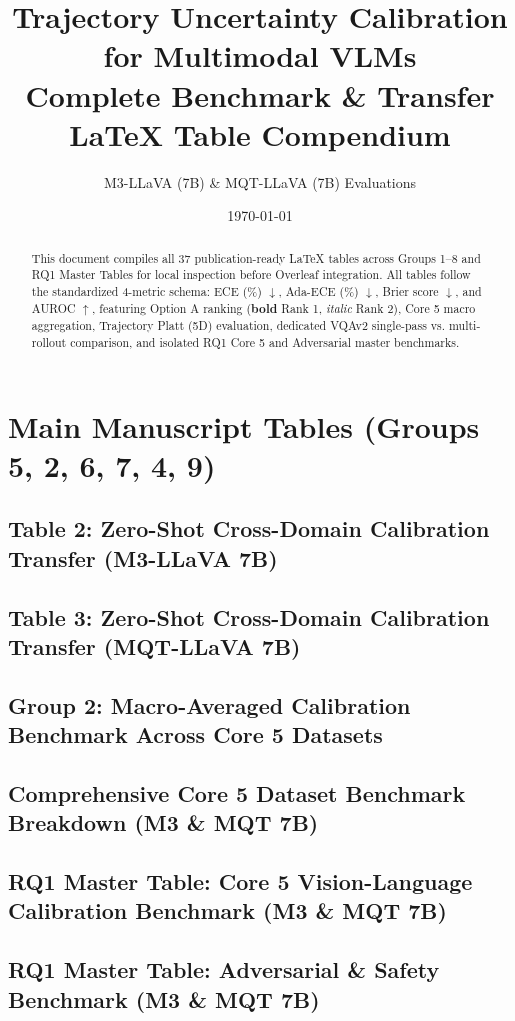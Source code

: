 \documentclass[11pt,a4paper]{article}
\title{\textbf{Trajectory Uncertainty Calibration for Multimodal VLMs}\\[0.4em] \Large Complete Benchmark \& Transfer LaTeX Table Compendium}
\author{M3-LLaVA (7B) \& MQT-LLaVA (7B) Evaluations}
\date{\today}
\begin{document}
\maketitle
\begin{abstract}
This document compiles all 37 publication-ready LaTeX tables across Groups 1--8 and RQ1 Master Tables for local inspection before Overleaf integration. All tables follow the standardized 4-metric schema: ECE (\%) $\downarrow$, Ada-ECE (\%) $\downarrow$, Brier score $\downarrow$, and AUROC $\uparrow$, featuring Option A ranking (\textbf{bold} Rank 1, \textit{italic} Rank 2), Core 5 macro aggregation, Trajectory Platt (5D) evaluation, dedicated VQAv2 single-pass vs. multi-rollout comparison, and isolated RQ1 Core 5 and Adversarial master benchmarks.
\end{abstract}
\tableofcontents
\clearpage
\section{Main Manuscript Tables (Groups 5, 2, 6, 7, 4, 9)}
\subsection{Table 2: Zero-Shot Cross-Domain Calibration Transfer (M3-LLaVA 7B)}

\clearpage
\subsection{Table 3: Zero-Shot Cross-Domain Calibration Transfer (MQT-LLaVA 7B)}

\clearpage
\subsection{Group 2: Macro-Averaged Calibration Benchmark Across Core 5 Datasets}

\clearpage
\subsection{Comprehensive Core 5 Dataset Benchmark Breakdown (M3 \& MQT 7B)}

\clearpage
\subsection{RQ1 Master Table: Core 5 Vision-Language Calibration Benchmark (M3 \& MQT 7B)}

\clearpage
\subsection{RQ1 Master Table: Adversarial \& Safety Benchmark (M3 \& MQT 7B)}

\clearpage
\end{document}
